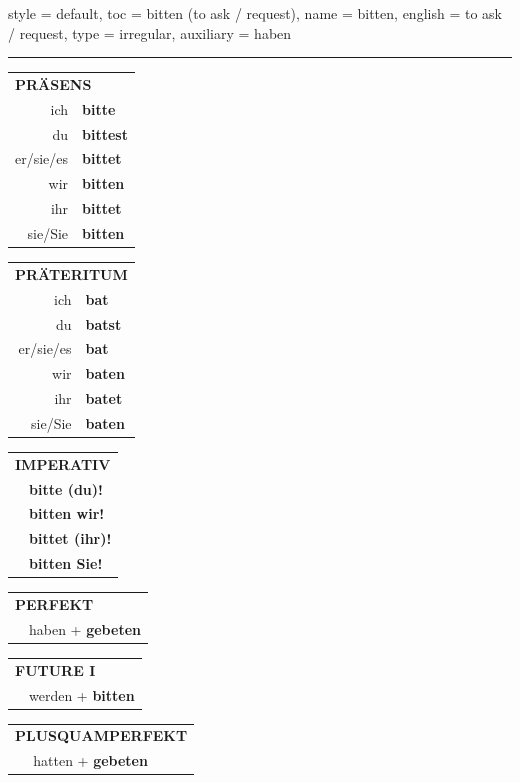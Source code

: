\begin{verbentry}{
  style = {default},
  toc = {bitten (to ask / request)},
  name = {bitten},
  english = {to ask / request},
  type = {irregular},
  auxiliary = {haben}
}


\vspace{5pt}
\hrule
\vspace{5pt}

\begin{tabular}{rl}
\multicolumn{2}{l}{\textbf{PRÄSENS}}\\
ich & \textbf{bitte}\\
du & \textbf{bittest}\\
er/sie/es & \textbf{bittet}\\
wir & \textbf{bitten}\\
ihr & \textbf{bittet}\\
sie/Sie & \textbf{bitten}\\
\end{tabular}
\hfill
\begin{tabular}{rl}
\multicolumn{2}{l}{\textbf{PRÄTERITUM}}\\
ich & \textbf{bat}\\
du & \textbf{batst}\\
er/sie/es & \textbf{bat}\\
wir & \textbf{baten}\\
ihr & \textbf{batet}\\
sie/Sie & \textbf{baten}\\
\end{tabular}
\hfill
\begin{tabular}{rl}
\multicolumn{2}{l}{\textbf{IMPERATIV}}\\
& \textbf{bitte (du)!}\\
& \textbf{bitten wir!}\\
& \textbf{bittet (ihr)!}\\
& \textbf{bitten Sie!}\\
\end{tabular}

\vspace{10pt}

\begin{tabular}{rl}
\multicolumn{2}{l}{\textbf{PERFEKT}}\\
& haben + \textbf{gebeten}\\
\end{tabular}
\hfill
\begin{tabular}{rl}
\multicolumn{2}{l}{\textbf{FUTURE I}}\\
& werden + \textbf{bitten}\\
\end{tabular}
\hfill
\begin{tabular}{rl}
\multicolumn{2}{l}{\textbf{PLUSQUAMPERFEKT}}\\
& hatten + \textbf{gebeten}\\
\end{tabular}


\end{verbentry}
